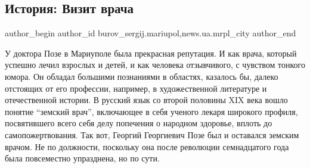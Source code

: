  
 
 
 
 
 
\subsection{История: Визит врача}
\label{sec:17_06_2017.stz.news.ua.mrpl_city.1.istoria_vizit_vracha}
 
\ifcmt
 author_begin
   author_id burov_sergij.mariupol,news.ua.mrpl_city
 author_end
\fi

У доктора Позе в Мариуполе была прекрасная репутация. И как врача, который
успешно лечил взрослых и детей, и как человека отзывчивого, с чувством тонкого
юмора. Он обладал большими познаниями в областях, казалось бы, далеко отстоящих
от его профессии, например, в художественной литературе и отечественной
истории. В русский язык со второй половины XIX века вошло понятие \enquote{земский
врач}, включающее в себя ученого лекаря широкого профиля, посвятившего всего
себя делу попечения о народном здоровье, вплоть до самопожертвования. Так вот,
Георгий Георгиевич Позе был и оставался земским врачом. Не по должности,
поскольку она после революции семнадцатого года была повсеместно упразднена, но
по сути. 



